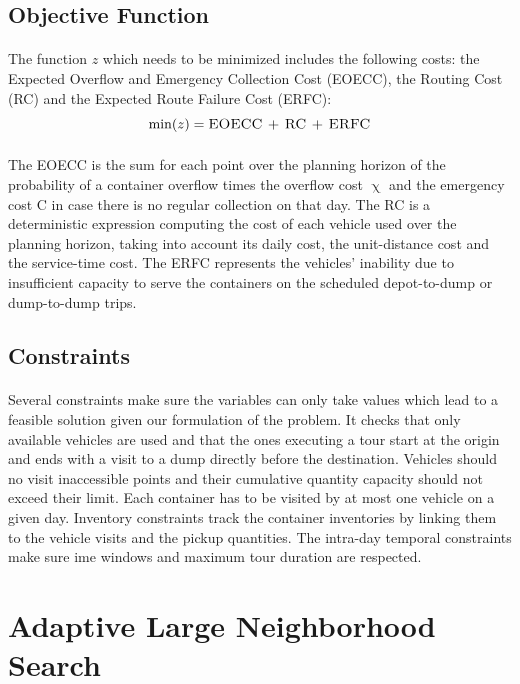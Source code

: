 \documentclass[12pt,a4paper]{article}
\begin{document}
\subsection{Objective Function}
\paragraph{}
The function $z$ which needs to be minimized includes the following costs: the Expected Overflow and Emergency Collection Cost (EOECC), the Routing Cost (RC) and the Expected Route Failure Cost (ERFC): $$\min(z) = \textsc{EOECC + RC + ERFC}$$ 
\paragraph{}
The EOECC is the sum for each point over the planning horizon of the probability of a container overflow times the overflow cost $\upchi$ and the emergency cost C in case there is no regular collection on that day. The RC is a deterministic expression computing the cost of each vehicle used over the planning horizon, taking into account its daily cost, the unit-distance cost and the service-time cost. The ERFC represents the vehicles' inability due to insufficient capacity to serve the containers on the scheduled depot-to-dump or dump-to-dump trips. 

\subsection{Constraints}
\paragraph{}
Several constraints make sure the variables can only take values which lead to a feasible solution given our formulation of the problem. It checks that only available vehicles are used and that the ones executing a tour start at the origin and ends with a visit to a dump directly before the destination. Vehicles should no visit inaccessible points and their cumulative quantity capacity should not exceed their limit. Each container has to be visited by at most one vehicle on a given day. Inventory constraints track the container inventories by linking them to the vehicle visits and the pickup quantities. The intra-day temporal constraints make sure ime windows and maximum tour duration are respected.

\section{Adaptive Large Neighborhood Search}
\end{document}
